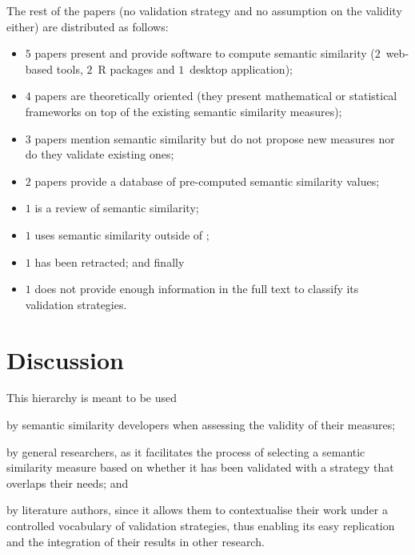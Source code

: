 The rest of the papers (no validation strategy and no assumption on the validity either) are distributed as follows:
\begin{itemize}
     \item $5$ papers present and provide software to compute semantic similarity ($2$~web-based tools, $2$~R packages and $1$~desktop application);
     \item $4$ papers are theoretically oriented (they present mathematical or statistical frameworks on top of the existing semantic similarity measures);
     \item $3$ papers mention semantic similarity but do not propose new measures nor do they validate existing ones;
     \item $2$ papers provide a database of pre-computed semantic similarity values;
     \item $1$ is a review of semantic similarity;
     \item $1$ uses semantic similarity outside of ;
     \item $1$ has been retracted; and finally
     \item $1$ does not provide enough information in the full text to classify its validation strategies.
\end{itemize}


\section{Discussion} \label{sec:validation/discussion}

This hierarchy is meant to be used
\begin{paralist}
    \item by semantic similarity developers when assessing the validity of their measures;
    \item by general researchers, as it facilitates the process of selecting a semantic similarity measure based on whether it has been validated with a strategy that overlaps their needs; and
    \item by literature authors, since it allows them to contextualise their work under a controlled vocabulary of validation strategies, thus enabling its easy replication and the integration of their results in other research.
\end{paralist}

